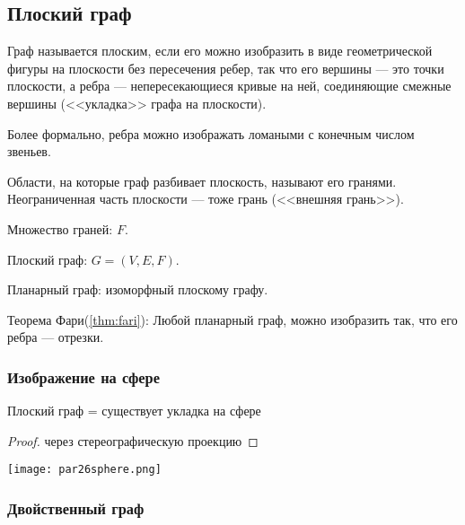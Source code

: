 \subsection{Плоский граф}

\begin{defn}
    Граф называется плоским, если его можно изобразить в виде геометрической фигуры на плоскости без пересечения ребер, так что его вершины --- это точки плоскости, а ребра --- непересекающиеся кривые на ней, соединяющие смежные вершины (<<укладка>> графа на плоскости).

    Более формально, ребра можно изображать ломаными с конечным числом звеньев.
\end{defn}

\begin{defn}
    Области, на которые граф разбивает плоскость, называют его гранями. Неограниченная часть плоскости --- тоже грань (<<внешняя грань>>).
\end{defn}

\begin{defn}
    Множество граней: $F$. 
\end{defn}

\begin{defn}
    Плоский граф: $G = (V, E, F)$.
\end{defn}

\begin{defn}
    Планарный граф: изоморфный плоскому графу.
\end{defn}

Теорема Фари(\ref*{thm:fari}): Любой планарный граф, можно изобразить так, что его ребра --- отрезки.

\subsubsection*{Изображение на сфере}

\begin{theorem-non}
    Плоский граф = существует укладка на сфере
\end{theorem-non}

\begin{proof}
    через стереографическую проекцию
\end{proof}

\begin{center}
    \texttt{[image: par26sphere.png]}
\end{center}

\subsubsection*{Двойственный граф}

